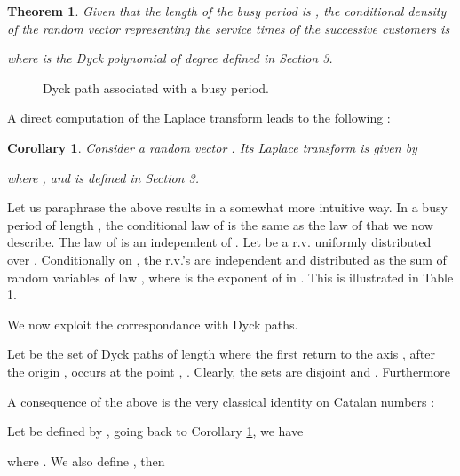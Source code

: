 \documentclass[11pt,a4paper]{article}
\numberwithin{equation}{section}
\newtheorem{cor}[prop]{Corollary}
\newtheorem{thm}[prop]{Theorem}
\newcommand{\1}{\mathbbm{1}}
\begin{document}
\begin{thm}\label{main}
Given that the length of the busy period is ,
the conditional density of the random vector
 representing the service
times of the successive customers is

where  is the Dyck polynomial of
degree  defined in Section 3.
\end{thm}
\begin{figure}[h]

\caption{Dyck path associated with a busy period.}
\label{bijec}
\end{figure}
A direct computation of the Laplace transform leads to the following :
\begin{cor}\label{Laplace trans}
Consider a random vector
.
Its Laplace transform is given by

where , and  is defined in Section 3.
\end{cor}
Let us paraphrase the above results in a somewhat more intuitive way.
In a busy period of length , the conditional law of
 is the same as the law of
 that we now describe.
The law of  is an  independent of
. Let  be a
r.v. uniformly distributed over . Conditionally on , the r.v.'s 
are independent and distributed as the sum of  random variables of law
, where  is the exponent of 
in . This is illustrated in Table 1.

We now exploit the correspondance with Dyck paths.

Let  be the set of Dyck paths of length  where the
first return to the axis , after the origin
, occurs at the point , . Clearly, the sets  
are disjoint and . Furthermore


A consequence of the above is the very classical identity on Catalan
numbers :

Let  be defined by , going back to Corollary \ref{Laplace trans}, we have

where . We also define , then
\end{document}
